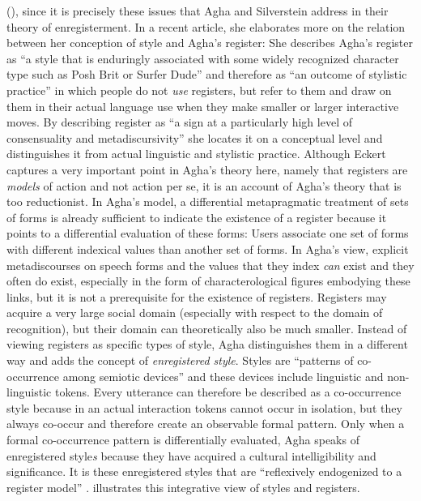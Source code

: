 (\citeyear[456--457]{Eckert2008}), since it is precisely these issues that Agha and Silverstein address in their theory of enregisterment. In a recent article, she elaborates more on the relation between her conception of style and Agha’s register: She describes Agha’s register as “a style that is enduringly associated with some widely recognized character type such as Posh Brit or Surfer Dude” and therefore as “an outcome of stylistic practice” \citep[76]{Eckert2016} in which people do not \emph{use} registers, but refer to them and draw on them in their actual language use when they make smaller or larger interactive moves. By describing register as “a sign at a particularly high level of consensuality and metadiscursivity” \citep[76]{Eckert2016} she locates it on a conceptual level and distinguishes it from actual linguistic and stylistic practice. Although Eckert captures a very important point in Agha’s theory here, namely that registers are \emph{models} of action and not action per se, it is an account of Agha’s theory that is too reductionist. In Agha’s model, a differential metapragmatic treatment of sets of forms is already sufficient to indicate the existence of a register because it points to a differential evaluation of these forms: Users associate one set of forms with different indexical values than another set of forms. In Agha’s view, explicit metadiscourses on speech forms and the values that they index \emph{can} exist and they often do exist, especially in the form of characterological figures embodying these links, but it is not a prerequisite for the existence of registers. Registers may acquire a very large social domain (especially with respect to the domain of recognition), but their domain can theoretically also be much smaller. Instead of viewing registers as specific types of style, Agha distinguishes them in a different way and adds the concept of \textit{enregistered style}. Styles are “patterns of co-occurrence among semiotic devices” \citep[186]{Agha2007} and these devices include linguistic and non-linguistic tokens. Every utterance can therefore be described as a co-occurrence style because in an actual interaction tokens cannot occur in isolation, but they always co-occur and therefore create an observable formal pattern. Only when a formal co-occurrence pattern is differentially evaluated, Agha speaks of enregistered style\textit{s} because they have acquired a cultural intelligibility and significance. It is these enregistered styles that are “reflexively endogenized to a register model” \citep[186]{Agha2007}.  illustrates this integrative view of styles and registers.



